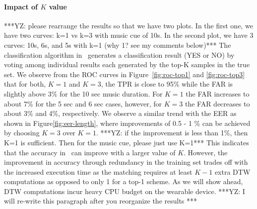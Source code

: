 
\paragraph{Impact of $K$ value}
***YZ: please rearrange the results so that we have two plots. In the first one, we have two curves: k=1 vs k=3 with music cue of 10s. In the second plot, we have 3 curves: 10s, 6s, and 5s with k=1 (why 1? see my comments below)***  The classification algorithm in \systemname~generates a classification result (YES or NO) by voting among individual results each generated by the top-K samples in the true set. We observe from the ROC curves in Figure~\ref{fig:roc-top1} and \ref{fig:roc-top3} that
for both, $K=1$ and $K=3$, the TPR is close to 95\% while the FAR is slightly
above 3\% for the 10 sec music duration. For $K = 1$ the FAR increases to
about 7\% for the 5 sec and 6 sec cases, however, for $K = 3$ the FAR
decreases to about 3\% and 4\%, respectively.
We observe a similar trend with the EER as shown in
Figure\ref{fig:eer-length}, where improvements of 0.5 - 1 \%
can be achieved by choosing $K = 3$ over $K = 1$. ***YZ: if the improvement is less than 1\%, then K=1 is sufficient. Then for the music cue, please just use K=1***
This indicates that the accuracy in \systemname~can improve with a larger
value of $K$. However, the improvement in accuracy through redundancy in the
training set trades off with the increased execution time as the
matching requires at least $K - 1$  extra DTW computations as opposed to only
1 for a top-1 scheme. As we will show ahead, DTW computations incur heavy CPU
budget on the wearable device.
***YZ: I will re-write this paragraph after you reorganize the results ***



